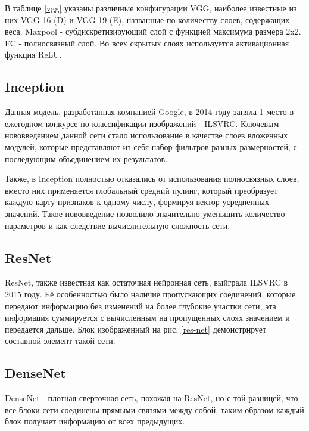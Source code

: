 В таблице \ref{vgg} указаны различные конфигурации VGG, наиболее известные из них VGG-16 (D) и VGG-19 (E), названные по количеству слоев, содержащих веса. Maxpool - субдискретизирующий слой с функцией максимума размера 2x2. FC - полносвязный слой. Во всех скрытых слоях используется активационная функция ReLU. 



\subsection{Inception}
Данная модель, разработанная компанией Google, в 2014 году заняла 1 место в ежегодном конкурсе по классификации изображений - ILSVRC\cite{1512.00567}. Ключевым нововведением данной сети стало использование в качестве слоев вложенных модулей, которые представляют из себя набор фильтров разных размерностей, с последующим объединением их результатов. 



Также, в Inception полностью отказались от использования полносвязных слоев, вместо них применяется глобальный средний пулинг, который преобразует каждую карту признаков к одному числу, формируя вектор усредненных значений. Такое нововведение позволило значительно уменьшить количество параметров и как следствие вычислительную сложность сети.


\subsection{ResNet}
ResNet\cite{ResNet}, также известная как остаточная нейронная сеть, выйграла ILSVRC в 2015 году. Её особенностью было наличие пропускающих соединений, которые передают информацию без изменений на более глубокие участки сети, эта информация суммируется с вычисленным на пропущенных слоях значением и передается дальше. Блок изображенный на рис. \ref{res-net} демонстрирует составной элемент такой сети.



\subsection{DenseNet}
DenseNet\cite{DenseNet} - плотная сверточная сеть, похожая на ResNet, но с той разницей, что все блоки сети соединены прямыми связями между собой, таким образом каждый блок получает информацию от всех предыдущих. 



\clearpage
